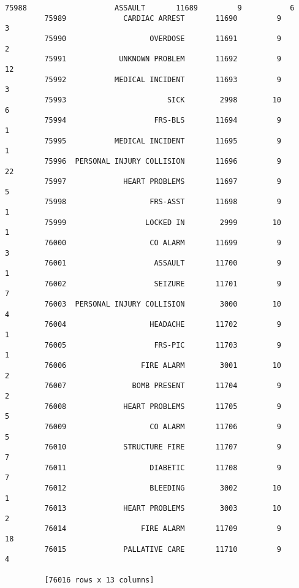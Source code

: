 \documentclass[11pt]{article}
\begin{document}
\begin{Verbatim}[commandchars=\\\{\}]
         75988                    ASSAULT       11689         9           6  
         75989             CARDIAC ARREST       11690         9           3  
         75990                   OVERDOSE       11691         9           2  
         75991            UNKNOWN PROBLEM       11692         9          12  
         75992           MEDICAL INCIDENT       11693         9           3  
         75993                       SICK        2998        10           6  
         75994                    FRS-BLS       11694         9           1  
         75995           MEDICAL INCIDENT       11695         9           1  
         75996  PERSONAL INJURY COLLISION       11696         9          22  
         75997             HEART PROBLEMS       11697         9           5  
         75998                   FRS-ASST       11698         9           1  
         75999                  LOCKED IN        2999        10           1  
         76000                   CO ALARM       11699         9           3  
         76001                    ASSAULT       11700         9           1  
         76002                    SEIZURE       11701         9           7  
         76003  PERSONAL INJURY COLLISION        3000        10           4  
         76004                   HEADACHE       11702         9           1  
         76005                    FRS-PIC       11703         9           1  
         76006                 FIRE ALARM        3001        10           2  
         76007               BOMB PRESENT       11704         9           2  
         76008             HEART PROBLEMS       11705         9           5  
         76009                   CO ALARM       11706         9           5  
         76010             STRUCTURE FIRE       11707         9           7  
         76011                   DIABETIC       11708         9           7  
         76012                   BLEEDING        3002        10           1  
         76013             HEART PROBLEMS        3003        10           2  
         76014                 FIRE ALARM       11709         9          18  
         76015             PALLATIVE CARE       11710         9           4  
         
         [76016 rows x 13 columns]
\end{Verbatim}
            
\end{document}
